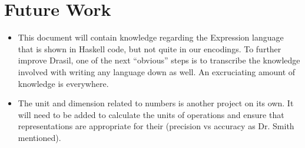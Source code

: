 \chapter{Future Work}
\label{chap:futureWork}


\begin{itemize}

      \item This document will contain knowledge regarding the Expression language
            that is shown in Haskell code, but not quite in our encodings. To
            further improve Drasil, one of the next ``obvious'' steps is to
            transcribe the knowledge involved with writing any language down as
            well. An excruciating amount of knowledge is everywhere.

      \item The unit and dimension related to numbers is another project on its
            own. It will need to be added to calculate the units of operations and
            ensure that representations are appropriate for their (precision vs
            accuracy as Dr. Smith mentioned).

\end{itemize}
